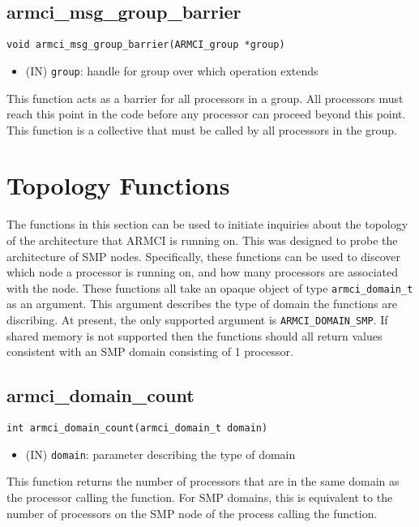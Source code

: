 \documentclass[12pt]{article}
\begin{document}
\subsection{armci\_msg\_group\_barrier}
\begin{verbatim}
void armci_msg_group_barrier(ARMCI_group *group)
\end{verbatim}
\begin{itemize}
\item (IN) \texttt{group}: handle for group over which operation extends
\end{itemize}
This function acts as a barrier for all processors in a group. All processors
must reach this point in the code before any processor can proceed beyond this
point. This function is a collective that must be called by all processors in the
group.

\section{Topology Functions}
The functions in this section can be used to initiate inquiries about the
topology of the architecture that ARMCI is running on. This was designed to
probe the architecture of SMP nodes. Specifically, these functions can be
used to discover which node a processor is running on, and how many processors
are associated with the node. These functions all take an opaque object of type
\texttt{armci\_domain\_t} as an argument. This argument describes the type of
domain the functions are discribing. At present, the only supported argument is
\texttt{ARMCI\_DOMAIN\_SMP}. If shared memory is not supported then the
functions should all return values consistent with an SMP domain consisting of 1
processor.

\subsection{armci\_domain\_count}
\begin{verbatim}
int armci_domain_count(armci_domain_t domain)
\end{verbatim}
\begin{itemize}
\item (IN) \texttt{domain}: parameter describing the type of domain
\end{itemize}
This function returns the number of processors that are in the same domain as
the processor calling the function. For SMP domains, this is equivalent to the
number of processors on the SMP node of the process calling the function.
\end{document}
